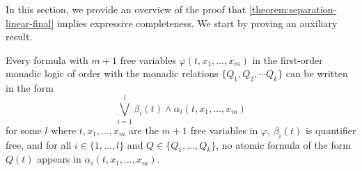 \documentclass[a4paper,UKenglish,cleveref, autoref, thm-restate, numberwithinsect]{lipics-v2021}
\begin{document}
In this section, we provide an overview of the proof that \cref{theorem:separation-linear-final} implies expressive completeness. We start by proving an auxiliary result.
\begin{lemma}
    \label{lemma:pulling-out-present-lemma}
    Every formula with $m + 1$ free variables $\varphi(t, x_1, \ldots, x_m)$ in the first-order monadic logic of order with the monadic relations $\{Q_1, Q_2, \cdots Q_k\}$ can be written in the form
    \begin{equation*}
        \bigvee_{i=1}^l \beta_i (t) \land \alpha_i(t, x_1, \ldots, x_m)
    \end{equation*}
    for some $l$ where $t, x_1, \ldots, x_m$ are the $m + 1$ free variables in $\varphi$, $\beta_i(t)$ is quantifier free, and for all $i \in \{1, \ldots, l\}$ and $Q \in \{Q_1, \ldots, Q_k\}$, no atomic formula of the form $Q(t)$ appears in $\alpha_i(t, x_1, \ldots, x_m)$.
\end{lemma}
\end{document}
